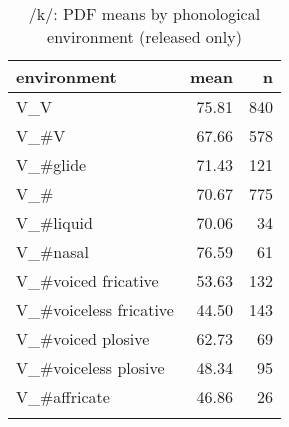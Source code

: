 \begin{table}
	
	\caption{/k/: PDF means by phonological environment (released only)}
	\label{tab.k.mean.environment}
	\begin{tabular}{lrr}
		\lsptoprule
		environment & mean \isi{PDF} & n\\
		\midrule
		V\_V & 75.81 & 840\\
		V\_\#V & 67.66 & 578\\
		V\_\#glide & 71.43 & 121\\
		V\_\# & 70.67 & 775\\
		V\_\#liquid & 70.06 & 34\\
		V\_\#nasal & 76.59 & 61\\
		V\_\#voiced fricative & 53.63 & 132\\
		V\_\#voiceless fricative & 44.50 & 143\\
		V\_\#voiced plosive & 62.73 & 69\\
		V\_\#voiceless plosive & 48.34 & 95\\
		V\_\#affricate & 46.86 & 26\\
		\lspbottomrule
	\end{tabular}
\end{table}

